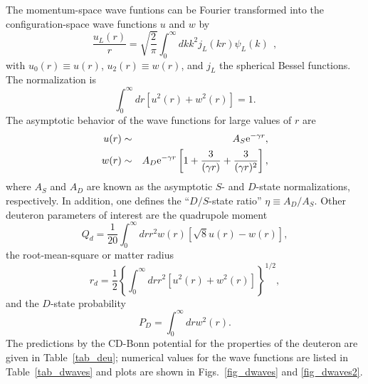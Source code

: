 The momentum-space wave funtions can be
Fourier transformed into 
the configuration-space wave functions $u$ and $w$ by
\begin{equation}
  \frac{u_L(r)}{r} = \sqrt{\frac{2}{\pi}}
  \int_0^\infty dk k^2 j_L(kr) \psi_L(k) \>\>,         \label{DFTW}
\end{equation}
with $u_0(r)\equiv u(r)$, $u_2(r)\equiv w(r)$,
and $j_L$ the spherical Bessel functions.
The normalization is
\begin{equation}
   \int_0^\infty dr \left[ u^2(r) + w^2(r) \right] = 1.
\end{equation}
The asymptotic behavior of the wave functions for large values of $r$
are
\begin{eqnarray}
  u(r) & \sim & A_S {\rm e}^{-\gamma r},  \nonumber\\
  w(r) & \sim & A_D {\rm e}^{-\gamma r}
      \left[ 1 + \frac{3}{(\gamma r)} + \frac{3}{(\gamma r)^2} \right],
                                    \label{DAW}
\end{eqnarray}
where $A_S$ and $A_D$ are known as the asymptotic $S$- and $D$-state
normalizations, respectively. In addition, one defines the
``$D/S$-state ratio'' $\eta\equiv A_D/A_S$.
Other deuteron parameters of interest are the quadrupole moment
\begin{equation}
  Q_d = \frac{1}{20} \int_0^\infty dr r^2 w(r)
        \left[ \sqrt{8} u(r) - w(r) \right],
\end{equation}
the root-mean-square or matter radius
\begin{equation}
  r_d = \frac12 \left\{\int_0^\infty dr r^2 \left[u^2(r) + w^2(r)
                \right]\right\}^{1/2},
\end{equation}
and the $D$-state probability
\begin{equation}
   P_D = \int_0^\infty dr w^2(r).
\end{equation}
The predictions by the CD-Bonn potential for the properties
of the deuteron are given in Table~\ref{tab_deu}; numerical values for
the wave functions are listed in Table~\ref{tab_dwaves}
and plots are shown in
Figs.~\ref{fig_dwaves} and \ref{fig_dwaves2}.

